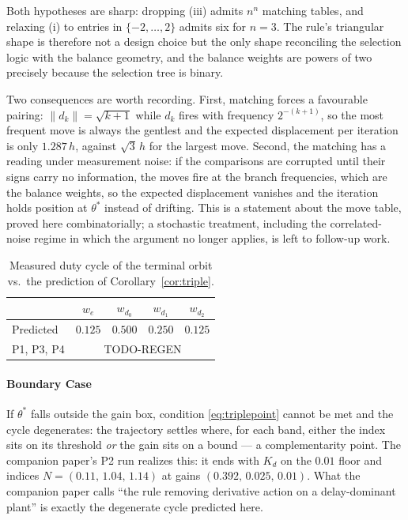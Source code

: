 \documentclass[letterpaper, 10pt, conference, twocolumn]{ieeeconf}
\begin{document}
Both hypotheses are sharp: dropping (iii) admits $n^n$ matching tables, and
relaxing (i) to entries in $\{-2, \dots, 2\}$ admits six for $n = 3$.
The rule's triangular shape is therefore not a design choice but the only
shape reconciling the selection logic with the balance geometry, and the
balance weights are powers of two precisely because the selection tree is
binary.

Two consequences are worth recording. First, matching forces a favourable
pairing: $\lVert d_k \rVert = \sqrt{k+1}$ while $d_k$ fires with frequency
$2^{-(k+1)}$, so the most frequent move is always the gentlest and the
expected displacement per iteration is only $1.287\,h$, against $\sqrt{3}\,h$
for the largest move. Second, the matching has a reading under measurement
noise: if the comparisons are corrupted until their signs carry no
information, the moves fire at the branch frequencies, which are the balance
weights, so the expected displacement vanishes and the iteration holds
position at $\theta^*$ instead of drifting. This is a statement about the
move table, proved here combinatorially; a stochastic treatment, including
the correlated-noise regime in which the argument no longer applies, is left
to follow-up work.

\begin{table}[t]
\small
\centering
\caption{Measured duty cycle of the terminal orbit vs.\ the prediction of
Corollary~\ref{cor:triple}.
}
\label{tab:duty}
\begin{tabular}{lcccc}
\toprule
 & $w_e$ & $w_{d_0}$ & $w_{d_1}$ & $w_{d_2}$ \\
\midrule
Predicted & $0.125$ & $0.500$ & $0.250$ & $0.125$ \\
P1, P3, P4 & \multicolumn{4}{c}{TODO-REGEN} \\
\bottomrule
\end{tabular}
\end{table}

\paragraph{Boundary Case} If $\theta^*$ falls outside the gain box, condition
\eqref{eq:triplepoint} cannot be met and the cycle degenerates: the trajectory
settles where, for each band, either the index sits on its threshold \emph{or}
the gain sits on a bound --- a complementarity point. The companion paper's P2
run realizes this: it ends with $K_d$ on the $0.01$ floor and indices
$N = (0.11,\, 1.04,\, 1.14)$ at gains $(0.392,\, 0.025,\, 0.01)$. What the
companion paper calls ``the rule removing derivative action on a
delay-dominant plant'' is exactly the degenerate cycle predicted here.
\end{document}
